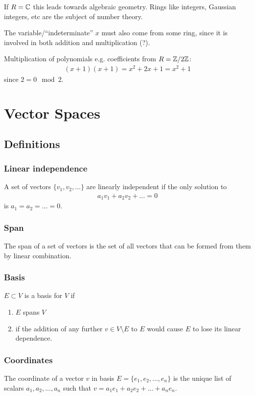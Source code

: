 If $R = \mathbb{C}$ this leads towards algebraic geometry. Rings like integers,
Gaussian integers, etc are the subject of number theory.

The variable/``indeterminate'' $x$ must also come from some ring, since it is
involved in both addition and multiplication (?).

Multiplication of polynomials e.g. coefficients from $R = \mathbb{Z}/2\mathbb{Z}$:
\begin{align*}
(x + 1)(x + 1) = x^2 + 2x + 1 = x^2 + 1
\end{align*}
since $2 = 0 \mod 2$.

\section{Vector Spaces}

\subsection{Definitions}

\subsubsection{Linear independence}
A set of vectors $\{v_1, v_2, \ldots\}$ are linearly independent if the only
solution to
\begin{align*}
  a_1v_1 + a_2v_2 + \ldots = 0
\end{align*}
is $a_1 = a_2 = \ldots = 0$.


\subsubsection{Span}
The span of a set of vectors is the set of all vectors that can be formed from
them by linear combination.


\subsubsection{Basis}
$E \subset V$ is a basis for $V$ if
\begin{enumerate}
\item $E$ spans $V$
\item if the addition of any further $v \in V\setminus E$ to $E$ would cause
  $E$ to lose its linear dependence.
\end{enumerate}


\subsubsection{Coordinates}
The coordinate of a vector $v$ in basis $E = \{e_1, e_2, \ldots, e_n\}$ is the
unique list of scalars $a_1, a_2, \ldots, a_n$ such that
$v = a_1e_1 + a_2e_2 + \ldots + a_ne_n$.


